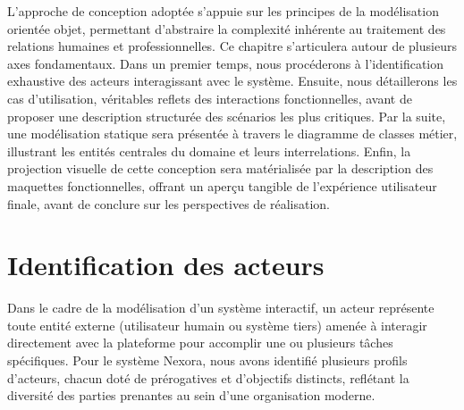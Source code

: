 \documentclass[12pt,a4paper]{article}
\begin{document}
L'approche de conception adoptée s'appuie sur les principes de la modélisation orientée objet, permettant d'abstraire la complexité inhérente au traitement des relations humaines et professionnelles. Ce chapitre s'articulera autour de plusieurs axes fondamentaux. Dans un premier temps, nous procéderons à l'identification exhaustive des acteurs interagissant avec le système. Ensuite, nous détaillerons les cas d'utilisation, véritables reflets des interactions fonctionnelles, avant de proposer une description structurée des scénarios les plus critiques. Par la suite, une modélisation statique sera présentée à travers le diagramme de classes métier, illustrant les entités centrales du domaine et leurs interrelations. Enfin, la projection visuelle de cette conception sera matérialisée par la description des maquettes fonctionnelles, offrant un aperçu tangible de l'expérience utilisateur finale, avant de conclure sur les perspectives de réalisation.

\section{Identification des acteurs}

Dans le cadre de la modélisation d'un système interactif, un acteur représente toute entité externe (utilisateur humain ou système tiers) amenée à interagir directement avec la plateforme pour accomplir une ou plusieurs tâches spécifiques. Pour le système Nexora, nous avons identifié plusieurs profils d'acteurs, chacun doté de prérogatives et d'objectifs distincts, reflétant la diversité des parties prenantes au sein d'une organisation moderne.
\end{document}
